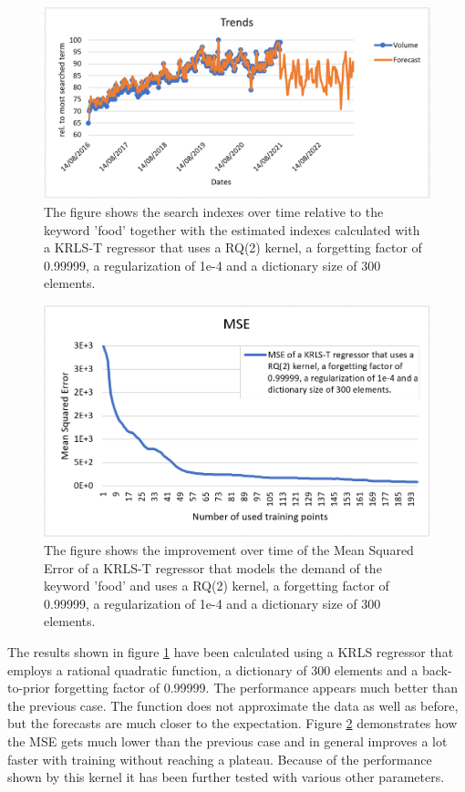 \begin{figure}[H]
	\centering
	\includegraphics[scale=0.6]{img/exp2.png}
	\caption{The figure shows the search indexes over time relative to the keyword 'food' together with the estimated indexes calculated with a KRLS-T regressor that uses a RQ(2) kernel, a forgetting factor of 0.99999, a regularization of 1e-4 and a dictionary size of 300 elements.}
	\label{Implementation:Trends 2}
\end{figure} 

\begin{figure}[H]
	\centering
	\includegraphics[scale=0.7]{img/exp2_mse.png}
	\caption{The figure shows the improvement over time of the Mean Squared Error of a KRLS-T regressor that models the demand of the keyword 'food' and uses a RQ(2) kernel, a forgetting factor of 0.99999, a regularization of 1e-4 and a dictionary size of 300 elements.}
	\label{Implementation:MSE 2}
\end{figure} 


The results shown in figure \ref{Implementation:Trends 2} have been calculated using a \ac{KRLS} regressor that employs a rational quadratic function, a dictionary of 300 elements and a back-to-prior forgetting factor of 0.99999. The performance appears much better than the previous case. The function does not approximate the data as well as before, but the forecasts are much closer to the expectation. Figure \ref{Implementation:MSE 2} demonstrates how the MSE gets much lower than the previous case and in general improves a lot faster with training without reaching a plateau. Because of the performance shown by this kernel it has been further tested with various other parameters.

